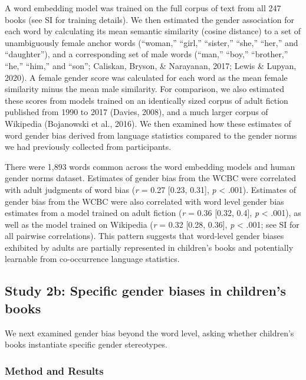 \documentclass[
  english,
  ,man,floatsintext]{apa6}
\begin{document}
A word embedding model was trained on the full corpus of text from all 247 books (see SI for training details). We then estimated the gender association for each word by calculating its mean semantic similarity (cosine distance) to a set of unambiguously female anchor words (\enquote{woman,} \enquote{girl,} \enquote{sister,} \enquote{she,} \enquote{her,} and \enquote{daughter}), and a corresponding set of male words (``man,'' ``boy,'' ``brother,'' ``he,'' ``him,'' and ``son''; Caliskan, Bryson, \& Narayanan, 2017; Lewis \& Lupyan, 2020). A female gender score was calculated for each word as the mean female similarity minus the mean male similarity. For comparison, we also estimated these scores from models trained on an identically sized corpus of adult fiction published from 1990 to 2017 (Davies, 2008), and a much larger corpus of Wikipedia (Bojanowski et al., 2016). We then examined how these estimates of word gender bias derived from language statistics compared to the gender norms we had previously collected from participants.

There were 1,893 words common across the word embedding models and human gender norms dataset. Estimates of gender bias from the WCBC were correlated with adult judgments of word bias (\emph{r} = 0.27 {[}0.23, 0.31{]}, \emph{p} \textless{} .001). Estimates of gender bias from the WCBC were also correlated with word level gender bias estimates from a model trained on adult fiction (\emph{r} = 0.36 {[}0.32, 0.4{]}, \emph{p} \textless{} .001), as well as the model trained on Wikipedia (\emph{r} = 0.32 {[}0.28, 0.36{]}, \emph{p} \textless{} .001; see SI for all pairwise correlations). This pattern suggests that word-level gender biases exhibited by adults are partially represented in children's books and potentially learnable from co-occurrence language statistics.

\hypertarget{study-2b-specific-gender-biases-in-childrens-books}{%
\subsection{Study 2b: Specific gender biases in children's books}\label{study-2b-specific-gender-biases-in-childrens-books}}

We next examined gender bias beyond the word level, asking whether children's books instantiate specific gender stereotypes.

\hypertarget{method-and-results-2}{%
\subsubsection{Method and Results}\label{method-and-results-2}}
\end{document}
